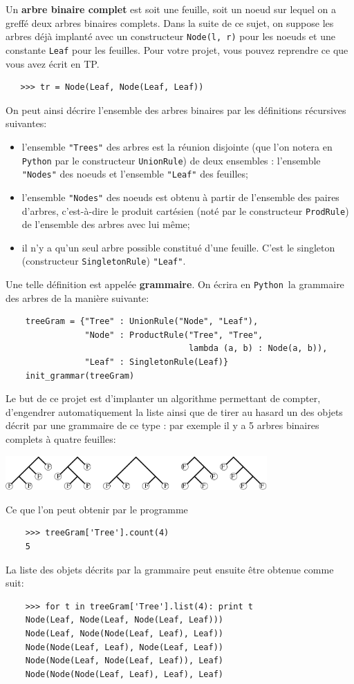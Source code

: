 \documentclass[11pt]{article}
\renewcommand{\emph}[1]{\textbf{#1}}
\newcommand{\Python}{\texttt{Python}}
\begin{document}
Un \emph{arbre binaire complet} est soit une feuille, soit un noeud sur lequel
on a greffé deux arbres binaires complets. Dans la suite de ce sujet, on
suppose les arbres déjà implanté avec un constructeur \texttt{Node(l, r)} pour
les noeuds et une constante \texttt{Leaf} pour les feuilles. Pour votre
projet, vous pouvez reprendre ce que vous avez écrit en TP.
\begin{verbatim}
   >>> tr = Node(Leaf, Node(Leaf, Leaf))
\end{verbatim}
On peut ainsi décrire l'ensemble des arbres binaires par les définitions
récursives suivantes:
\begin{itemize}
\item l'ensemble \texttt{"Trees"} des arbres est la réunion disjointe (que
  l'on notera en \Python{} par le constructeur \texttt{UnionRule}) de deux
  ensembles : l'ensemble \texttt{"Nodes"} des noeuds et l'ensemble
  \texttt{"Leaf"} des feuilles;
\item l'ensemble \texttt{"Nodes"} des noeuds est obtenu à partir de l'ensemble
  des paires d'arbres, c'est-à-dire le produit cartésien (noté par le
  constructeur \texttt{ProdRule}) de l'ensemble des arbres avec lui même;
\item il n'y a qu'un seul arbre possible constitué d'une feuille. C'est le
  singleton (constructeur \texttt{SingletonRule}) \texttt{"Leaf"}.
\end{itemize}
Une telle définition est appelée \emph{grammaire}. On écrira en
\Python\ la grammaire des arbres de la manière suivante:
\begin{verbatim}
    treeGram = {"Tree" : UnionRule("Node", "Leaf"),
                "Node" : ProductRule("Tree", "Tree", 
                                     lambda (a, b) : Node(a, b)),
                "Leaf" : SingletonRule(Leaf)}
    init_grammar(treeGram)
\end{verbatim}
Le but de ce projet est d'implanter un algorithme permettant de compter,
d'engendrer automatiquement la liste ainsi que de tirer au hasard un des
objets décrit par une grammaire de ce type : par exemple il y a 5 arbres
binaires complets à quatre feuilles:
\begin{center}
  \includegraphics[width=10cm]{arbres.pdf}
\end{center}


\noindent Ce que l'on peut obtenir par le programme
\begin{verbatim}
    >>> treeGram['Tree'].count(4)
    5
\end{verbatim}
La liste des objets décrits par la grammaire peut ensuite être obtenue comme
suit:
\begin{verbatim}
    >>> for t in treeGram['Tree'].list(4): print t
    Node(Leaf, Node(Leaf, Node(Leaf, Leaf)))
    Node(Leaf, Node(Node(Leaf, Leaf), Leaf))
    Node(Node(Leaf, Leaf), Node(Leaf, Leaf))
    Node(Node(Leaf, Node(Leaf, Leaf)), Leaf)
    Node(Node(Node(Leaf, Leaf), Leaf), Leaf)
\end{verbatim}
\end{document}
